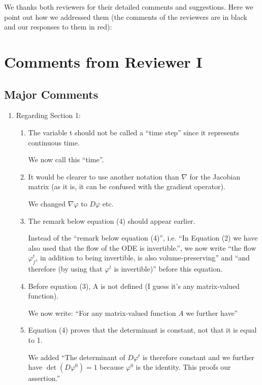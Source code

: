 \documentclass{article}
\begin{document}
We thanks both reviewers for their detailed comments and suggestions. Here we point out how we addressed them (the comments of the reviewers are in black and our responses to them in {\color{mred} red}):

\section{Comments from Reviewer I}

\subsection*{Major Comments}
\begin{enumerate}
\item Regarding Section 1:
\begin{enumerate}[label=\arabic*.]
\item The variable t should not be called a ``time step'' since it represents continuous time.

    {\color{mred}We now call this ``time''}.

\item It would be clearer to use another notation than $\nabla$ for the Jacobian matrix (as it is, it can be confused with the gradient operator).

    {\color{mred}We changed $\nabla\varphi$ to $D\varphi$ etc.}

\item The remark below equation (4) should appear earlier.

    {\color{mred} Instead of the ``remark below equation (4)'', i.e. ``In Equation (2) we have also used that the flow of the ODE is invertible.'',  we now write ``the flow $\varphi_f^t$, in addition to being invertible, is also volume-preserving'' and ``and therefore (by using that $\varphi^t$ is invertible)'' before this equation.}

\item Before equation (3), A is not defined (I guess it's any matrix-valued function).

    {\color{mred} We now write: ``For any matrix-valued function $A$ we further have''}

\item Equation (4) proves that the determinant is constant, not that it is equal to 1.

    {\color{mred} We added ``The determinant of $D\varphi^t$ is therefore constant and we further have $\det(D\varphi^0) = 1$ because $\varphi^0$ is the identity. This proofs our assertion.''}


\end{enumerate}
\end{enumerate}
\end{document}
